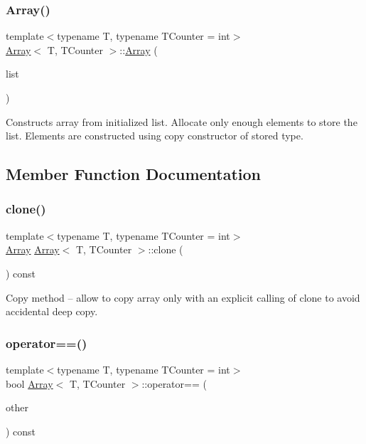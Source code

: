 \subsubsection{\texorpdfstring{Array()}{Array()}\hspace{0.1cm}{\footnotesize\ttfamily [2/2]}}
{\footnotesize\ttfamily template$<$typename T, typename T\+Counter = int$>$ \\
\hyperlink{classArray}{Array}$<$ T, T\+Counter $>$\+::\hyperlink{classArray}{Array} (\begin{DoxyParamCaption}\item[{std\+::initializer\+\_\+list$<$ T $>$}]{list }\end{DoxyParamCaption})\hspace{0.3cm}{\ttfamily [inline]}}

Constructs array from initialized list. Allocate only enough elements to store the list. Elements are constructed using copy constructor of stored type. 

\subsection{Member Function Documentation}
\hypertarget{classArray_a7cb2b9b74ad6856612d0bfcdbb0be366}{}\label{classArray_a7cb2b9b74ad6856612d0bfcdbb0be366} 
\subsubsection{\texorpdfstring{clone()}{clone()}}
{\footnotesize\ttfamily template$<$typename T, typename T\+Counter = int$>$ \\
\hyperlink{classArray}{Array} \hyperlink{classArray}{Array}$<$ T, T\+Counter $>$\+::clone (\begin{DoxyParamCaption}{ }\end{DoxyParamCaption}) const\hspace{0.3cm}{\ttfamily [inline]}}

Copy method -- allow to copy array only with an explicit calling of \textquotesingle{}clone\textquotesingle{} to avoid accidental deep copy. \hypertarget{classArray_a7eff7030d460a572a7076f2ed2464448}{}\label{classArray_a7eff7030d460a572a7076f2ed2464448} 
\subsubsection{\texorpdfstring{operator==()}{operator==()}}
{\footnotesize\ttfamily template$<$typename T, typename T\+Counter = int$>$ \\
bool \hyperlink{classArray}{Array}$<$ T, T\+Counter $>$\+::operator== (\begin{DoxyParamCaption}\item[{const \hyperlink{classArray}{Array}$<$ T, T\+Counter $>$ \&}]{other }\end{DoxyParamCaption}) const\hspace{0.3cm}{\ttfamily [inline]}}

